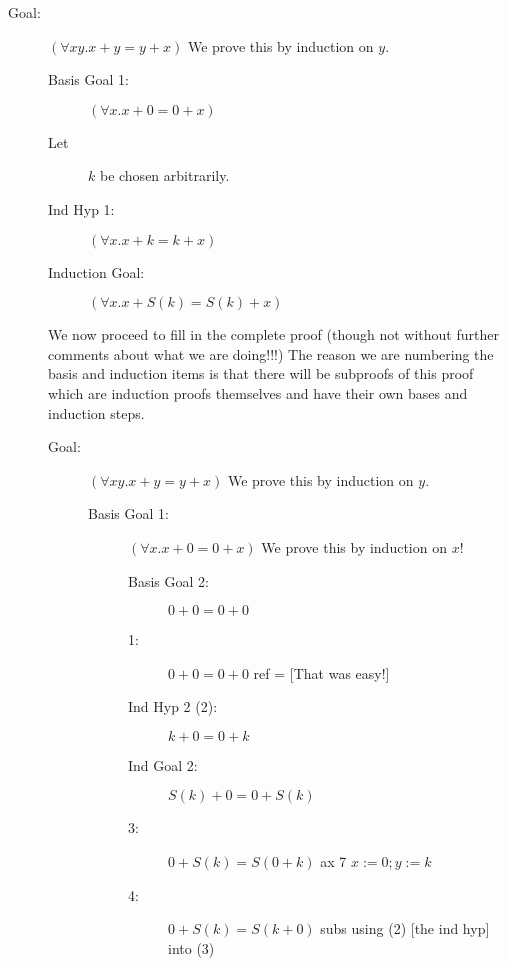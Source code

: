 \documentclass[12pt]{article}
\begin{document}
\begin{description}

\item[Goal:]  $(\forall xy.x+y=y+x)$  We prove this by induction on $y$.

\begin{description}

\item[Basis Goal 1:]  $(\forall x.x+0=0+x)$

\item[Let] $k$ be chosen arbitrarily.

\item[Ind Hyp 1:]  $(\forall x.x+k=k+x)$ 

\item[Induction Goal:]  $(\forall x.x+S(k)=S(k)+x)$


\end{description}

We now proceed to fill in the complete proof (though not without further comments about what we are doing!!!)
The reason we are numbering the basis and induction items is that there will be subproofs of this proof which are
induction proofs themselves and have their own bases and induction steps.

\begin{description}

\item[Goal:]  $(\forall xy.x+y=y+x)$  We prove this by induction on $y$.

\begin{description}

\item[Basis Goal 1:]  $(\forall x.x+0=0+x)$  We prove this by induction on $x$!

\begin{description}

\item[Basis Goal 2:]  $0+0=0+0$

\item[1:]  $0+0=0+0$  ref =  [That was easy!]

\newpage

\item[Ind Hyp 2 (2):]   $k+0=0+k$

\item[Ind Goal 2:]  $S(k)+0=0+S(k)$

\item[3:]  $0+S(k)=S(0+k)$  ax 7 $x:=0; y:=k$

\item[4:]  $0+S(k)=S(k+0)$  subs using (2) [the ind hyp] into (3)


\end{description}
\end{description}
\end{description}
\end{description}
\end{document}

